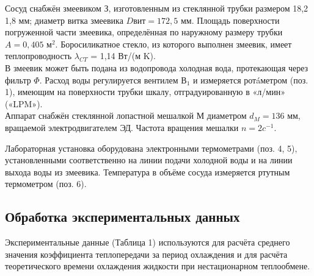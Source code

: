 \documentclass[12pt, a4paper]{article}
\begin{document}
Сосуд снабжён змеевиком З, изготовленным из стеклянной трубки размером {\diameter} 18,2 1,8 мм; диаметр витка змеевика $Dвит = 172,5$ мм. 
Площадь поверхности погруженной части змеевика, определённая по 
наружному размеру трубки $A = 0,405$ м$^2$. 
Боросиликатное стекло, из которого выполнен змеевик, имеет теплопроводность  ${\lambda}_{CT}$ = 1,14 Вт/(м K).\\

В змеевик может быть подана из водопровода холодная вода, протекающая через фильтр $\Phi$. Расход воды регулируется вентилем $В_1$ и измеряется ротáметром (поз. 1), имеющим на поверхности трубки шкалу, отградуированную в «л/мин» («LPM»).\\

Аппарат снабжён стеклянной лопастной мешалкой М диаметром $d_{M} = 136$ мм, 
вращаемой электродвигателем ЭД. Частота вращения мешалки $n = 2c^{-1}$.

Лабораторная установка оборудована электронными термометрами
(поз. 4, 5), установленными соответственно на линии подачи холодной воды и на линии выхода воды из змеевика. Температура в объёме сосуда измеряется ртутным термометром (поз. 6).


\newpage
\begin{center}
\subsection*{Обработка экспериментальных данных}
\end{center}
Экспериментальные данные (Таблица 1) используются для расчёта среднего значения коэффициента теплопередачи за период охлаждения и для расчёта
теоретического времени охлаждения жидкости при нестационарном теплообмене.\\
\end{document}
